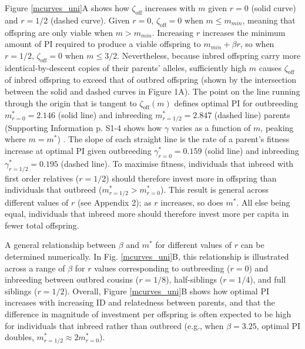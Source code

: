 \documentclass[12pt]{article}
\begin{document}
Figure \ref{mcurves_uni}A shows how $\zeta_{\textrm{off}}$ increases with $m$ given $r=0$ (solid curve) and $r=1/2$ (dashed curve). Given $r=0$, $\zeta_{\textrm{off}}=0$ when $m \leq m_{min}$, meaning that offspring are only viable when $m>m_{min}$. Increasing $r$ increases the minimum amount of PI required to produce a viable offspring to $m_{min}+\beta r$, so when $r=1/2$, $\zeta_{\textrm{off}}=0$ when $m \leq 3/2$. Nevertheless, because inbred offspring carry more identical-by-descent copies of their parents' alleles, sufficiently high $m$ causes $\zeta_{\textrm{off}}$ of inbred offspring to exceed that of outbred offspring (shown by the intersection between the solid and dashed curves in Figure 1A). The point on the line running through the origin that is tangent to $\zeta_{\textrm{off}}(m)$ defines optimal PI for outbreeding $m^{*}_{r=0}=2.146$ (solid line) and inbreeding $m^{*}_{r=1/2}=2.847$ (dashed line) parents (Supporting Information p. S1-4 shows how $\gamma$ varies as a function of $m$, peaking where $m=m^{*}$) . The slope of each straight line is the rate of a parent's fitness increase at optimal PI given outbreeding $\gamma^{*}_{r=0}=0.159$ (solid line) and inbreeding $\gamma^{*}_{r=1/2}=0.195$ (dashed line). To maximise fitness, individuals that inbreed with first order relatives ($r=1/2$) should therefore invest more in offspring than individuals that outbreed ($m^{*}_{r=1/2}>m^{*}_{r=0}$). This result is general across different values of $r$ (see Appendix 2); as $r$ increases, so does $m^{*}$. All else being equal, individuals that inbreed more should therefore invest more per capita in fewer total offspring. 

A general relationship between $\beta$ and $m^{*}$ for different values of $r$ can be determined numerically. In Fig. \ref{mcurves_uni}B, this relationship is illustrated across a range of $\beta$ for $r$ values corresponding to outbreeding ($r=0$) and inbreeding between outbred cousins ($r=1/8$), half-siblings ($r=1/4$), and full siblings ($r=1/2$). Overall, Figure \ref{mcurves_uni}B shows how optimal PI increases with increasing ID and relatedness between parents, and that the difference in magnitude of investment per offspring is often expected to be high for individuals that inbreed rather than outbreed (e.g., when $\beta=3.25$, optimal PI doubles, $m^{*}_{r=1/2} \approx 2m^{*}_{r=0}$). 
\end{document}
